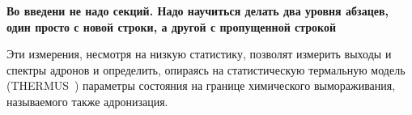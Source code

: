 \textbf{ Во введени не надо секций. Надо научиться делать два уровня абзацев, один просто с новой строки, а другой с пропущенной строкой}









Эти измерения, несмотря на низкую статистику, позволят измерить выходы и спектры адронов и определить, опираясь на статистическую термальную модель (THERMUS~\cite{THERMUS}) параметры состояния на границе химического вымораживания, называемого также адронизация.


